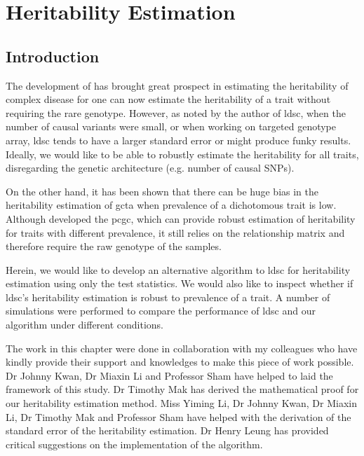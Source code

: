 \chapter{Heritability Estimation}

	\section{Introduction}
	The development of  has brought great prospect in estimating the heritability of complex disease for one can now estimate the heritability of a trait without requiring the rare genotype. 
	However, as noted by the author of \gls{ldsc}, when the number of causal variants were small, or when working on targeted genotype array, \gls{ldsc} tends to have a larger standard error or might produce funky results\citep{Bulik-Sullivan2015}.
	Ideally, we would like to be able to robustly estimate the heritability for all traits, disregarding the genetic architecture (e.g. number of causal \glspl{SNP}).
	
	On the other hand, it has been shown that there can be huge bias in the heritability estimation of \gls{gcta} when prevalence of a dichotomous trait is low\citep{Golan2014}.
	Although \citet{Golan2014} developed the \gls{pcgc}, which can provide robust estimation of heritability for traits with different prevalence, it still relies on the relationship matrix and therefore require the raw genotype of the samples. 
	
	Herein, we would like to develop an alternative algorithm to \gls{ldsc} for heritability estimation using only the test statistics. 
	We would also like to inspect whether if \gls{ldsc}'s heritability estimation is robust to prevalence of a trait. 
	A number of simulations were performed to compare the performance of \gls{ldsc} and our algorithm under different conditions.
	
	The work in this chapter were done in collaboration with my colleagues who have kindly provide their support and knowledges to make this piece of work possible.
	Dr Johnny Kwan, Dr Miaxin Li and Professor Sham have helped to laid the framework of this study. 
	Dr Timothy Mak has derived the mathematical proof for our heritability estimation method. 
	Miss Yiming Li, Dr Johnny Kwan, Dr Miaxin Li, Dr Timothy Mak and Professor Sham have helped with the derivation of the standard error of the heritability estimation. 
	Dr Henry Leung has provided critical suggestions on the implementation of the algorithm.
	
